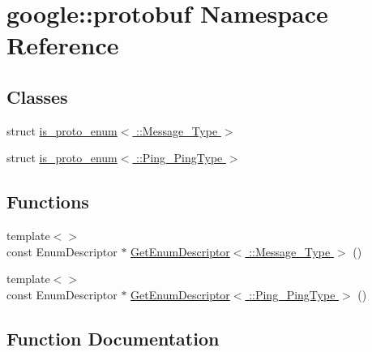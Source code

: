 \hypertarget{namespacegoogle_1_1protobuf}{}\section{google\+:\+:protobuf Namespace Reference}
\label{namespacegoogle_1_1protobuf}
\subsection*{Classes}
\begin{DoxyCompactItemize}
\item 
struct \hyperlink{structgoogle_1_1protobuf_1_1is__proto__enum_3_01_1_1_message___type_01_4}{is\+\_\+proto\+\_\+enum$<$ \+::\+Message\+\_\+\+Type $>$}
\item 
struct \hyperlink{structgoogle_1_1protobuf_1_1is__proto__enum_3_01_1_1_ping___ping_type_01_4}{is\+\_\+proto\+\_\+enum$<$ \+::\+Ping\+\_\+\+Ping\+Type $>$}
\end{DoxyCompactItemize}
\subsection*{Functions}
\begin{DoxyCompactItemize}
\item 
{\footnotesize template$<$$>$ }\\const Enum\+Descriptor $\ast$ \hyperlink{namespacegoogle_1_1protobuf_a68ff7e8c0cac9aa455585f1a91e7aece}{Get\+Enum\+Descriptor$<$ \+::\+Message\+\_\+\+Type $>$} ()
\item 
{\footnotesize template$<$$>$ }\\const Enum\+Descriptor $\ast$ \hyperlink{namespacegoogle_1_1protobuf_ab483d4902925c478c7781d2210837718}{Get\+Enum\+Descriptor$<$ \+::\+Ping\+\_\+\+Ping\+Type $>$} ()
\end{DoxyCompactItemize}


\subsection{Function Documentation}
